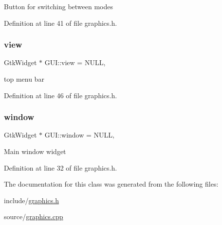 Button for switching between modes 

Definition at line 41 of file graphics.\+h.

\mbox{\label{class_g_u_i_a3ecda752022bea96ce708bcb6566cea6}} 
\subsubsection{\texorpdfstring{view}{view}}
{\footnotesize\ttfamily Gtk\+Widget $\ast$ G\+U\+I\+::view = N\+U\+LL\hspace{0.3cm}{\ttfamily [static]}, {\ttfamily [protected]}}

top menu bar 

Definition at line 46 of file graphics.\+h.

\mbox{\label{class_g_u_i_ae307bf43cbe1839cc5d849b916e0c27c}} 
\subsubsection{\texorpdfstring{window}{window}}
{\footnotesize\ttfamily Gtk\+Widget $\ast$ G\+U\+I\+::window = N\+U\+LL\hspace{0.3cm}{\ttfamily [static]}, {\ttfamily [protected]}}

Main window widget 

Definition at line 32 of file graphics.\+h.



The documentation for this class was generated from the following files\+:\begin{DoxyCompactItemize}
\item 
include/\mbox{\hyperlink{graphics_8h}{graphics.\+h}}\item 
source/\mbox{\hyperlink{graphics_8cpp}{graphics.\+cpp}}\end{DoxyCompactItemize}

